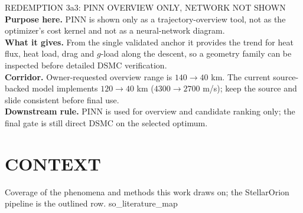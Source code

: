 \documentclass[aspectratio=169,11pt]{beamer}
\begin{document}
\begin{frame}{REDEMPTION 3a3: PINN OVERVIEW ONLY, NETWORK NOT SHOWN}
  \small
  \textbf{Purpose here.} PINN is shown only as a trajectory-overview tool, not
  as the optimizer's cost kernel and not as a neural-network diagram.\\
  \textbf{What it gives.} From the single validated anchor it provides the trend
  for heat flux, heat load, drag and $g$-load along the descent, so a geometry
  family can be inspected before detailed DSMC verification.\\
  \textbf{Corridor.} Owner-requested overview range is $140\rightarrow40$ km.
  The current source-backed model implements $120\rightarrow40$ km
  ($4300\rightarrow2700$ m/s); keep the source and slide consistent before final use.\\
  \textbf{Downstream rule.} PINN is used for overview and candidate ranking only;
  the final gate is still direct DSMC on the selected optimum.
\end{frame}

\section{CONTEXT}
  {%
   Coverage of the phenomena and methods this work draws on; the
   StellarOrion pipeline is the outlined row.}
  {so_literature_map}
\end{document}
